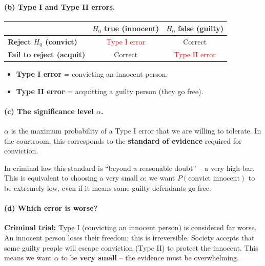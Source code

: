 \documentclass[11pt]{article}
\begin{document}
\paragraph{(b) Type I and Type II errors.}

\begin{center}
\renewcommand{\arraystretch}{1.4}
\begin{tabular}{lcc}
\toprule
& \textbf{$H_0$ true (innocent)} & \textbf{$H_0$ false (guilty)} \\
\midrule
\textbf{Reject $H_0$ (convict)} & \textcolor{red}{Type I error} & Correct \\
\textbf{Fail to reject (acquit)} & Correct & \textcolor{red}{Type II error} \\
\bottomrule
\end{tabular}
\end{center}

\begin{itemize}
  \item \textbf{Type I error} = convicting an innocent person.
  \item \textbf{Type II error} = acquitting a guilty person (they go free).
\end{itemize}

\paragraph{(c) The significance level $\alpha$.}

$\alpha$ is the maximum probability of a Type I error that we are willing to tolerate. In the courtroom, this corresponds to the \textbf{standard of evidence} required for conviction.

In criminal law this standard is ``beyond a reasonable doubt'' -- a very high bar. This is equivalent to choosing a very small $\alpha$: we want $P(\text{convict innocent})$ to be extremely low, even if it means some guilty defendants go free.

\paragraph{(d) Which error is worse?}

\textbf{Criminal trial:} Type I (convicting an innocent person) is considered far worse. An innocent person loses their freedom; this is irreversible. Society accepts that some guilty people will escape conviction (Type II) to protect the innocent. This means we want $\alpha$ to be \textbf{very small} -- the evidence must be overwhelming.
\end{document}

